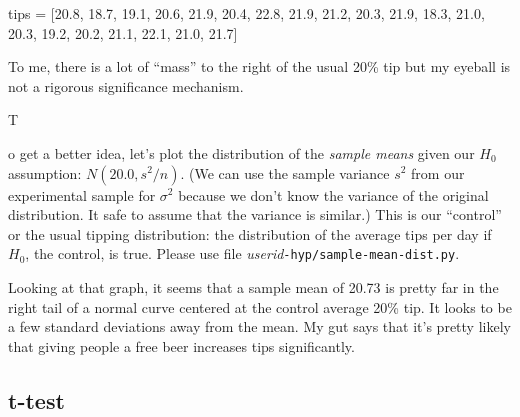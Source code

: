 \documentclass[titlepage]{tufte-book}
\newcounter{problem}
\newcommand{\step}[1]{{}
\vspace{4pt} \noindent {\bf \theproblem. }#1\addtocounter{problem}{1}}
\begin{document}
\begin{fullwidth}
\begin{pyverbatim}
tips = [20.8, 18.7, 19.1, 20.6, 21.9, 20.4, 22.8,
        21.9, 21.2, 20.3, 21.9, 18.3, 21.0, 20.3,
        19.2, 20.2, 21.1, 22.1, 21.0, 21.7]
\end{pyverbatim}

\noindent To me, there is a lot of ``mass'' to the right of the usual 20\% tip but my eyeball is not a rigorous significance mechanism. 

\step To get a better idea, let's plot the distribution of the {\em sample means} given our $H_0$ assumption: $N(20.0, s^2/n)$.  (We can use the sample variance $s^2$ from our experimental sample for $\sigma^2$ because we don't know the variance of the original distribution. It safe to assume that the variance is similar.)  This is our ``control'' or the usual tipping distribution: the distribution of the average tips per day if $H_0$, the control, is true. Please use file {\em userid}{\tt -hyp/sample-mean-dist.py}.  


Looking at that graph, it seems that a sample mean of 20.73 is pretty far in the right tail of a normal curve centered at the control average 20\% tip. It looks to be a few standard deviations away from the mean. My gut says that it's pretty likely that giving people a free beer increases tips significantly.

\subsection{t-test}


\end{fullwidth}
\end{document}
